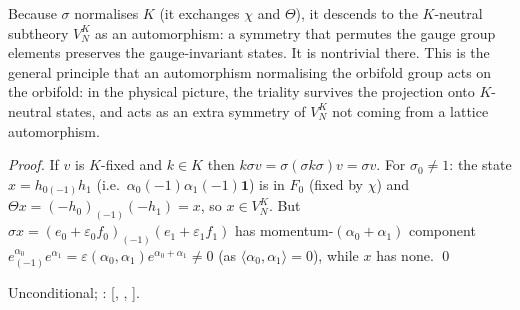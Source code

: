 \begin{physics}
Because $\sigma$ normalises $K$ (it exchanges $\chi$ and $\Theta$), it descends to the $K$-neutral subtheory $V_N^K$ as an automorphism: a symmetry that permutes the gauge group elements preserves the gauge-invariant states. It is nontrivial there. This is the general principle that an automorphism normalising the orbifold group acts on the orbifold: in the physical picture, the triality survives the projection onto $K$-neutral states, and acts as an extra symmetry of $V_N^K$ not coming from a lattice automorphism.
\end{physics}
\emph{Proof.}  If $v$ is $K$-fixed and $k\in K$ then $k\sigma v=\sigma(\sigma k\sigma)v=\sigma v$.
For $\sigma_0\ne1$: the state $x=h_{0(-1)}h_1$ (i.e.\ $\alpha_0(-1)\alpha_1(-1)\mathbf 1$) is in $F_0$
(fixed by $\chi$) and $\Theta x=(-h_0)_{(-1)}(-h_1)=x$, so $x\in V_N^K$.  But
$\sigma x=(e_0+\varepsilon_0f_0)_{(-1)}(e_1+\varepsilon_1f_1)$ has momentum-$(\alpha_0+\alpha_1)$ component
$e^{\alpha_0}_{(-1)}e^{\alpha_1}=\varepsilon(\alpha_0,\alpha_1)e^{\alpha_0+\alpha_1}\ne0$ (as
$\langle\alpha_0,\alpha_1\rangle=0$), while $x$ has none. \qed
\begin{status}Unconditional; : [,
, ].\end{status}

